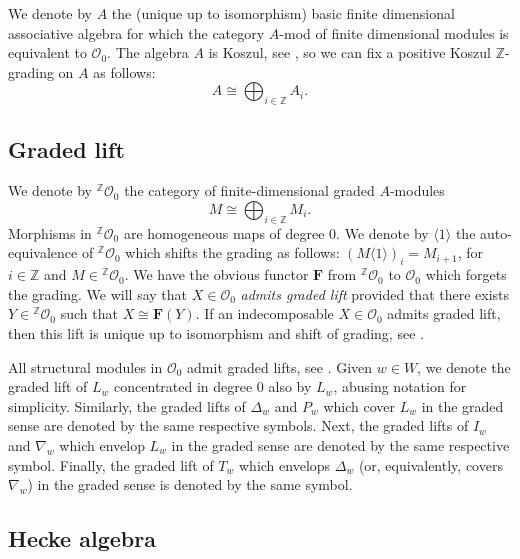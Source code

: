 \documentclass[a4paper]{amsart}
\begin{document}
We denote by $A$ the (unique up to isomorphism) basic
finite dimensional associative algebra for which 
the category $A$-mod of finite dimensional modules
is equivalent to $\mathcal{O}_0$. The algebra 
$A$ is Koszul, see \cite{So}, so we can fix a 
positive Koszul $\mathbb{Z}$-grading on $A$ as follows:
\begin{displaymath}
A\cong\bigoplus_{i\in\mathbb{Z}}A_i. 
\end{displaymath}

\subsection{Graded lift}\label{s1.4}

We denote by ${}^{\mathbb{Z}}\mathcal{O}_0$ the category of
finite-dimensional graded $A$-modules
\begin{displaymath}
M\cong\bigoplus_{i\in\mathbb{Z}}M_i. 
\end{displaymath}
Morphisms in 
${}^{\mathbb{Z}}\mathcal{O}_0$ are homogeneous maps of
degree $0$. We denote by $\langle 1\rangle$ the 
auto-equivalence of ${}^{\mathbb{Z}}\mathcal{O}_0$
which shifts the grading as follows:
$(M\langle 1\rangle)_i=M_{i+1}$, for $i\in\mathbb{Z}$
and $M\in {}^{\mathbb{Z}}\mathcal{O}_0$.
We have the obvious functor $\mathbf{F}$ from 
${}^{\mathbb{Z}}\mathcal{O}_0$ to
$\mathcal{O}_0$ which forgets the grading.
We will say that $X\in \mathcal{O}_0$
{\em admits graded lift} provided that there exists
$Y\in {}^{\mathbb{Z}}\mathcal{O}_0$ such that 
$X\cong\mathbf{F}(Y)$. If an indecomposable 
$X\in \mathcal{O}_0$ admits graded lift, then this
lift is unique up to isomorphism and shift of grading, 
see \cite{St}.

All structural modules in $\mathcal{O}_0$ admit graded lifts,
see \cite{MO3}.
Given $w\in W$, we denote the graded lift of 
$L_w$ concentrated in degree $0$ also by $L_w$,
abusing notation for simplicity. Similarly,
the graded lifts of $\Delta_w$ and $P_w$ which
cover $L_w$ in the graded sense are denoted
by the same respective symbols. Next, the graded
lifts of $I_w$ and $\nabla_w$ which envelop 
$L_w$ in the graded sense are denoted by the 
same respective symbol. Finally, the graded 
lift of $T_w$ which envelops $\Delta_w$
(or, equivalently, covers $\nabla_w$) in the 
graded sense is denoted by the same symbol.

\subsection{Hecke algebra}\label{s1.5}
\end{document}
